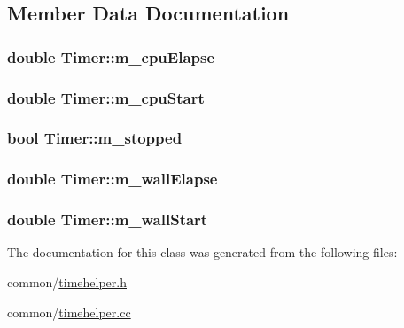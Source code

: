 \subsection{Member Data Documentation}
\hypertarget{classTimer_a2a4f00e691d0f32fb46309837f66642d}{
\subsubsection[{m\-\_\-cpu\-Elapse}]{\setlength{\rightskip}{0pt plus 5cm}double Timer\-::m\-\_\-cpu\-Elapse\hspace{0.3cm}{\ttfamily [private]}}}\label{classTimer_a2a4f00e691d0f32fb46309837f66642d}
\hypertarget{classTimer_ae072fa4d42cb04afff3d4250d8de03ab}{
\subsubsection[{m\-\_\-cpu\-Start}]{\setlength{\rightskip}{0pt plus 5cm}double Timer\-::m\-\_\-cpu\-Start\hspace{0.3cm}{\ttfamily [private]}}}\label{classTimer_ae072fa4d42cb04afff3d4250d8de03ab}
\hypertarget{classTimer_ade39ad67f4ecaad82572e8796a92704d}{
\subsubsection[{m\-\_\-stopped}]{\setlength{\rightskip}{0pt plus 5cm}bool Timer\-::m\-\_\-stopped\hspace{0.3cm}{\ttfamily [private]}}}\label{classTimer_ade39ad67f4ecaad82572e8796a92704d}
\hypertarget{classTimer_a1690291df791cbb10d4f88e3a4e9b721}{
\subsubsection[{m\-\_\-wall\-Elapse}]{\setlength{\rightskip}{0pt plus 5cm}double Timer\-::m\-\_\-wall\-Elapse\hspace{0.3cm}{\ttfamily [private]}}}\label{classTimer_a1690291df791cbb10d4f88e3a4e9b721}
\hypertarget{classTimer_ac521ba372c283e38c382254b3e23063f}{
\subsubsection[{m\-\_\-wall\-Start}]{\setlength{\rightskip}{0pt plus 5cm}double Timer\-::m\-\_\-wall\-Start\hspace{0.3cm}{\ttfamily [private]}}}\label{classTimer_ac521ba372c283e38c382254b3e23063f}


The documentation for this class was generated from the following files\-:\begin{DoxyCompactItemize}
\item 
common/\hyperlink{timehelper_8h}{timehelper.\-h}\item 
common/\hyperlink{timehelper_8cc}{timehelper.\-cc}\end{DoxyCompactItemize}
